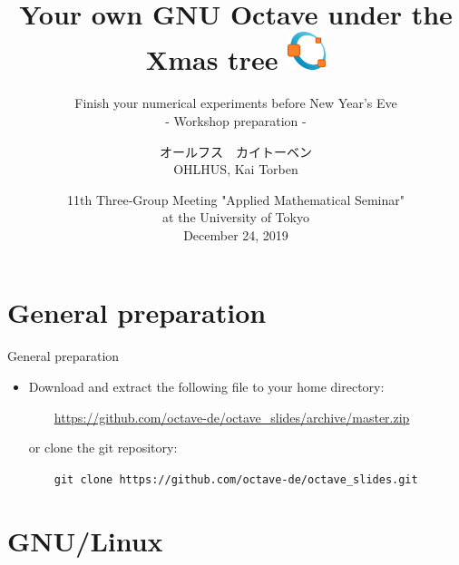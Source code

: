 \documentclass[xcolor=svgnames,aspectratio=169]{beamer}
\title[GNU Octave]{Your own GNU Octave under the Xmas tree
  \includegraphics[width=1.5em]{res/images/octave-logo-1024.png}
}
\subtitle{Finish your numerical experiments before New Year's Eve
\\[1em]
{\Large- Workshop preparation -}}
\author[Kai T. Ohlhus]{
  オールフス　カイトーベン \\
  OHLHUS, Kai Torben}
\institute[TWCU]{
  Graduate School of Science \\
  Tokyo Woman's Christian University}
\date[December 24, 2019]{11th Three-Group Meeting "Applied Mathematical Seminar" \\
at the University of Tokyo \\[1em]
December 24, 2019}
\begin{document}
{
\frame{\titlepage}
}

\section{General preparation}

\frame{\tableofcontents}
\begin{frame}{General preparation}
\begin{itemize}
\item
Download and extract the following file to your home directory:

\vfill

{\color{DarkBlue}
$\qquad$\url{https://github.com/octave-de/octave_slides/archive/master.zip}
}

\vfill

or clone the git repository:

\vfill

$\qquad$\texttt{git clone https://github.com/octave-de/octave\_slides.git}
\end{itemize}


\end{frame}


\section{GNU/Linux}

\frame{\tableofcontents[currentsection]}

\end{document}
